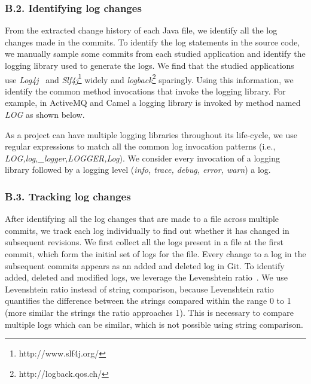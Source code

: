 \subsubsection*{B.2. Identifying log changes}
From the extracted change history of each {Java} file, we identify all the log changes made in the commits. To identify the log statements in the source code, we manually sample some commits from each studied application and identify the logging library used to generate the logs. We find that the studied applications use \textsl{Log4j}~\cite{EMSEIAN} and \textsl{Slf4j}\footnote{http://www.slf4j.org/} widely and \textsl{logback}\footnote{http://logback.qos.ch/} sparingly. Using this information, we identify the common method invocations that invoke the logging library. For example, in  ActiveMQ and Camel a logging library is invoked by method named \emph{LOG} as shown below.


As a project can have multiple logging libraries throughout its life-cycle, we use regular expressions to match all the common log invocation patterns (i.e., \emph{LOG,log,\_logger,LOGGER,Log}). We consider every invocation of a logging library followed by a logging level (\emph{info, trace, debug, error, warn}) a log.


\subsubsection*{B.3. Tracking log changes}
After identifying all the log changes that are made to a file across multiple commits, we track each log individually to find out whether it has changed in subsequent revisions. We first collect all the logs present in a file at the first commit, which form the initial set of logs for the file. Every change to a log in the subsequent commits appears as an added and deleted log in Git. To identify added, deleted and modified logs, we leverage the Levenshtein ratio~\cite{levenshteinratio}. We use Levenshtein ratio instead of string comparison, because Levenshtein ratio quantifies the difference between the strings compared within the range 0 to 1 (more similar the strings the ratio approaches 1). This is necessary to compare multiple logs which can be similar, which is not possible using string comparison.




